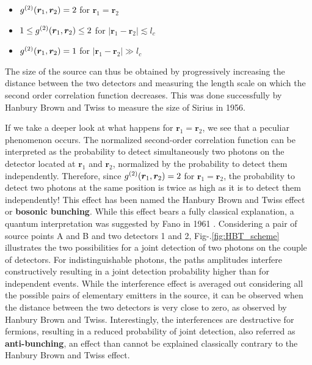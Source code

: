 \begin{itemize}
    \item $g^{(2)} (\bm{r}_1,\bm{r}_2)=2$ for $\bm{r}_1=\bm{r}_2$
    \item $1 \leq g^{(2)} (\bm{r}_1,\bm{r}_2) \leq 2$ for $|\bm{r}_1-\bm{r}_2| \lesssim l_{c}$
    \item $g^{(2)} (\bm{r}_1,\bm{r}_2)=1$ for $|\bm{r}_1-\bm{r}_2| \gg l_{c}$
\end{itemize}

The size of the source can thus be obtained by progressively increasing the distance between the two detectors and measuring the length scale on which the second order correlation function decreases. This was done successfully by Hanbury Brown and Twiss \cite{brown1956test} to measure the size of Sirius in 1956.

If we take a deeper look at what happens for $\bm{r}_1=\bm{r}_2$, we see that a peculiar phenomenon occurs. The normalized second-order correlation function can be interpreted as the probability to detect simultaneously two photons on the detector located at $\bm{r}_1$ and $\bm{r}_2$, normalized by the probability to detect them independently. Therefore, since $g^{(2)} (\bm{r}_1,\bm{r}_2)=2$ for $\bm{r}_1=\bm{r}_2$, the probability to detect two photons at the same position is twice as high as it is to detect them independently! This effect has been named the Hanbury Brown and Twiss effect or \textbf{bosonic bunching}. While this effect bears a fully classical explanation, a quantum interpretation was suggested by Fano in 1961 \cite{fano1961quantum}. Considering a pair of source points A and B and two detectors 1 and 2, Fig-.\ref{fig:HBT_scheme} illustrates the two possibilities for a joint detection of two photons on the couple of detectors. For indistinguishable photons, the paths amplitudes interfere constructively resulting in a joint detection probability higher than for independent events. While the interference effect is averaged out considering all the possible pairs of elementary emitters in the source, it can be observed when the distance between the two detectors is very close to zero, as observed by Hanbury Brown and Twiss. Interestingly, the interferences are destructive for fermions, resulting in a reduced probability of joint detection, also referred as \textbf{anti-bunching}, an effect than cannot be explained classically contrary to the Hanbury Brown and Twiss effect. 

